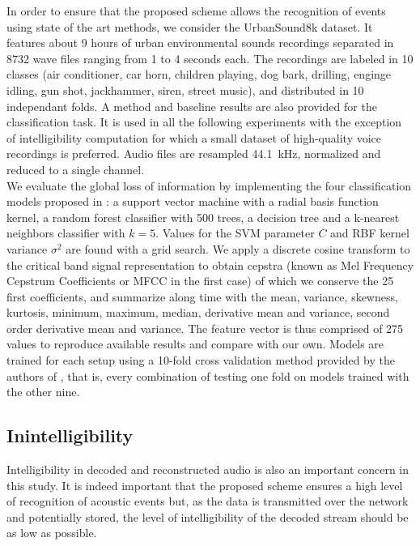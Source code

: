 \documentclass[final,3p,times,twocolumn]{elsarticle}
\begin{document}
In order to ensure that the proposed scheme allows the recognition of events using state of the art methods, we consider the UrbanSound8k dataset\cite{salamon2014}. It features about 9 hours of urban environmental sounds recordings separated in 8732 wave files ranging from 1 to 4 seconds each. The recordings are labeled in 10 classes (air conditioner, car horn, children playing, dog bark, drilling, enginge idling, gun shot, jackhammer, siren, street music), and distributed in 10 independant folds. A method and baseline results are also provided for the classification task. It is used in all the following experiments with the exception of intelligibility computation for which a small dataset of high-quality voice recordings is preferred. Audio files are resampled 44.1~kHz, normalized and reduced to a single channel.\\

We evaluate the global loss of information by implementing the four classification models proposed in \cite{salamon2014}: a support vector machine with a radial basis function kernel, a random forest classifier with 500 trees, a decision tree and a k-nearest neighbors classifier with $k = 5$. Values for the SVM parameter $C$ and RBF kernel variance $\sigma^2$ are found with a grid search. We apply a discrete cosine transform to the critical band signal representation to obtain cepstra (known as Mel Frequency Cepstrum Coefficients or MFCC in the first case) of which we conserve the 25 first coefficients, and summarize along time with the mean, variance, skewness, kurtosis, minimum, maximum, median, derivative mean and variance, second order derivative mean and variance. The feature vector is thus comprised of 275 values to reproduce available results and compare with our own. Models are trained for each setup using a 10-fold cross validation method provided by the authors of \cite{salamon2014}, that is, every combination of testing one fold on models trained with the other nine.

\subsection{Inintelligibility}

Intelligibility in decoded and reconstructed audio is also an important concern in this study. It is indeed important that the proposed scheme ensures a high level of recognition of acoustic events but, as the data is transmitted over the network and potentially stored, the level of intelligibility of the decoded stream should be as low as possible.
\end{document}
